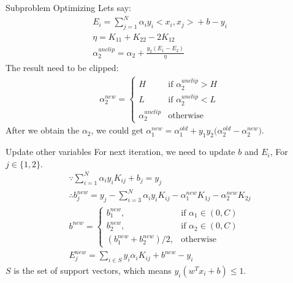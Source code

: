\documentclass{beamer}
\begin{document}
\begin{frame}{Subproblem Optimizing}
    Lets say:
    \begin{gather*}
        E_i = \sum_{j=1}^N \alpha_i y_i \bigl< x_i, x_j \bigr> + b - y_i \\
        \eta = K_{11} + K_{22} - 2K_{12} \\
        \alpha_2^{unclip} = \alpha_2 + \frac{y_2(E_1 - E_2)}{\eta}
     \end{gather*}
     The result need to be clipped:
     \begin{gather*}
        \alpha_2^{new} = \begin{cases}
        H &\text{if } \alpha_2^{unclip} > H \\
        L &\text{if } \alpha_2^{unclip} < L \\
        \alpha_2^{unclip} &\text{otherwise}
        \end{cases}
     \end{gather*}
     After we obtain the $\alpha_2$, we could get $\alpha_1^{new} = \alpha_1^{old} + y_1y_2\bigl(\alpha_2^{old} - \alpha_2^{new}\bigr)$.
\end{frame}

\begin{frame}{Update other variables}
    For next iteration, we need to update $b$ and $E_i$, For $j \in \{1, 2\}$.
    \begin{gather*}
        \because \sum_{i=1}^N \alpha_i y_i K_{ij} + b_j = y_j \\
        \therefore b_j^{new} = y_j - \sum_{i=3}^N \alpha_i y_i K_{ij} - \alpha_1^{new} K_{1j} - \alpha_2^{new} K_{2j} \\
        b^{new} = \begin{cases}
        b_1^{new}, &\text{if } \alpha_1 \in (0, C) \\
        b_2^{new}, &\text{if } \alpha_2 \in (0, C) \\
        (b_1^{new}+b_2^{new})/2, &\text{otherwise}
        \end{cases} \\
        E_j^{new} = \sum_{i \in S} y_i \alpha_i K_{ij} + b^{new} - y_i
    \end{gather*}
    $S$ is the set of support vectors, which means $y_i(w^Tx_i + b) \leq 1$.
\end{frame}
\end{document}

